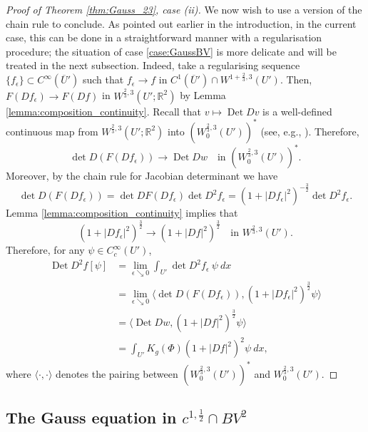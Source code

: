 \documentclass[12pt]{article}
\newcommand{\R}{\mathbb{R}}
\newcommand{\Det}{\operatorname{Det}}
\theoremstyle{plain}
\numberwithin{equation}{section}
\begin{document}
\begin{proof}[Proof of Theorem \ref{thm:Gauss_23}, case (ii)]
   We now wish to use a version of the chain rule to conclude. As pointed out earlier in the introduction, in the current case, this can be done in a straightforward manner with a regularisation procedure; the situation of case \eqref{case:GaussBV} is more delicate and will be treated in the next subsection. Indeed, take a regularising sequence $\{f_\epsilon\} \subset C^\infty(\overline U')$ such that $f_\epsilon \to f$ in $C^1(\overline U') \cap W^{1+\frac23,3}(U')$. Then, $F(Df_\epsilon) \to F(Df)$ in $W^{\frac23,3}(U';\R^2)$ by Lemma \ref{lemma:composition_continuity}. Recall that $v \mapsto \Det Dv$ is a well-defined continuous map from $W^{\frac23,3}(U';\R^2)$ into $(W^{\frac23,3}_0(U'))^*$ (see, e.g., \cite[Proposition 1]{gladbach_olbermann}). Therefore,
   \begin{equation*}
    \det D(F(Df_\epsilon)) \to \Det Dw \quad \text{in } (W^{\frac23,3}_0(U'))^*.
   \end{equation*}
   Moreover, by the chain rule for Jacobian determinant we have
   \begin{equation*}
       \det D(F(Df_\epsilon)) = \det DF(Df_\epsilon)\det D^2 f_\epsilon =(1+|Df_\epsilon|^2)^{-\frac32} \det D^2 f_\epsilon.
   \end{equation*}
   Lemma \ref{lemma:composition_continuity} implies that
   \begin{equation*}
       (1+|Df_\epsilon|^2)^\frac32 \to (1+|Df|^2)^\frac32 \quad \text{in } W^{\frac23,3}(U').
   \end{equation*}
   Therefore, for any $\psi \in C^\infty_c(U')$,
   \begin{align*}
       \Det D^2 f[\psi] &= \lim_{\epsilon \searrow 0} \int_{U'} \det D^2 f_\epsilon~ \psi ~dx\\
       &= \lim_{\epsilon \searrow 0} \Big\langle \det D(F(Df_\epsilon)), (1+|Df_\epsilon|^2)^\frac32 \psi \Big\rangle\\
       &= \Big\langle\Det Dw , (1+|Df|^2)^\frac32 \psi\Big\rangle\\
       &= \int_{U'} K_g(\Phi)(1+|Df|^2)^2 \psi~dx,
   \end{align*}
   where $\langle \cdot, \cdot\rangle$ denotes the pairing between $(W^{\frac23,3}_0(U'))^*$ and $W^{\frac23,3}_0(U')$.
\end{proof}

\subsection{The Gauss equation in $c^{1,\frac12} \cap BV^2$} \label{sec:BV_Gauss}
\end{document}
